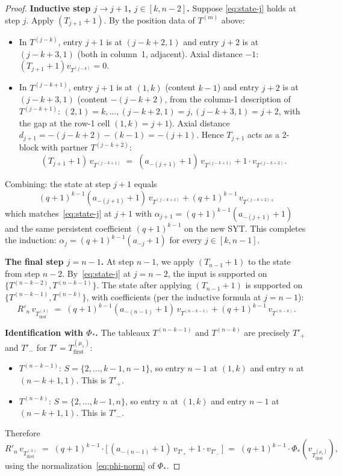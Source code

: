 \documentclass[11pt]{article}
\theoremstyle{definition}
\begin{document}
\begin{proof}
\textbf{Inductive step $j \to j+1$, $j \in [k, n-2]$.}  Suppose
\eqref{eq:state-j} holds at step $j$.  Apply $(T_{j+1} + 1)$.  By the
position data of $T^{(m)}$ above:
\begin{itemize}[leftmargin=2em,topsep=0.2em,itemsep=0.1em]
\item In $T^{(j-k)}$, entry $j+1$ is at $(j-k+2, 1)$ and entry $j+2$ is
   at $(j-k+3, 1)$ (both in column~1, adjacent).  Axial distance $-1$:
   $(T_{j+1} + 1) v_{T^{(j-k)}} = 0$.
\item In $T^{(j-k+1)}$, entry $j+1$ is at $(1, k)$ (content $k-1$) and
   entry $j+2$ is at $(j-k+3, 1)$ (content $-(j-k+2)$, from the column-1
   description of $T^{(j-k+1)}$: $(2,1) = k, \ldots, (j-k+2, 1) = j,
   (j-k+3, 1) = j+2$, with the gap at the row-1 cell $(1, k) = j+1$).
   Axial distance
   $d_{j+1} = -(j-k+2) - (k-1) = -(j+1)$.  Hence $T_{j+1}$ acts as a
   2-block with partner $T^{(j-k+2)}$:
   \[
      (T_{j+1}+1)\,v_{T^{(j-k+1)}}
      \;=\; (a_{-(j+1)} + 1)\,v_{T^{(j-k+1)}} + 1 \cdot v_{T^{(j-k+2)}}.
   \]
\end{itemize}
Combining: the state at step $j+1$ equals
\[
   (q+1)^{k-1}(a_{-(j+1)}+1)\,v_{T^{(j-k+1)}} + (q+1)^{k-1}\, v_{T^{(j-k+2)}},
\]
which matches~\eqref{eq:state-j} at $j+1$ with
$\alpha_{j+1} = (q+1)^{k-1}(a_{-(j+1)}+1)$ and the same persistent
coefficient $(q+1)^{k-1}$ on the new SYT.  This completes the induction:
$\alpha_j = (q+1)^{k-1}(a_{-j}+1)$ for every $j \in [k, n-1]$.

\textbf{The final step $j = n-1$.}  At step $n-1$, we apply
$(T_{n-1}+1)$ to the state from step $n-2$.  By~\eqref{eq:state-j} at
$j = n - 2$, the input is supported on $\{T^{(n-k-2)}, T^{(n-k-1)}\}$.
The state after applying $(T_{n-1}+1)$ is supported on
$\{T^{(n-k-1)}, T^{(n-k)}\}$, with coefficients (per the inductive
formula at $j = n-1$):
\[
   R'_n\, v_{T_{\mathrm{first}}^{(\lambda)}}
   \;=\; (q+1)^{k-1}(a_{-(n-1)}+1)\, v_{T^{(n-k-1)}}
       + (q+1)^{k-1}\, v_{T^{(n-k)}}.
\]

\textbf{Identification with $\Phi_*$.}  The tableaux $T^{(n-k-1)}$ and
$T^{(n-k)}$ are precisely $T'_+$ and $T'_-$ for
$T' = T_{\mathrm{first}}^{(\mu_1)}$:
\begin{itemize}[leftmargin=2em,topsep=0.2em,itemsep=0.1em]
\item $T^{(n-k-1)}$: $S = \{2, \ldots, k-1, n-1\}$, so entry $n-1$ at
   $(1,k)$ and entry $n$ at $(n-k+1, 1)$.  This is $T'_+$.
\item $T^{(n-k)}$: $S = \{2, \ldots, k-1, n\}$, so entry $n$ at $(1,k)$
   and entry $n-1$ at $(n-k+1, 1)$.  This is $T'_-$.
\end{itemize}
Therefore
\[
   R'_n\, v_{T_{\mathrm{first}}^{(\lambda)}}
   \;=\; (q+1)^{k-1} \cdot \big[\,(a_{-(n-1)} + 1)\, v_{T'_+}
       + 1 \cdot v_{T'_-}\,\big]
   \;=\; (q+1)^{k-1} \cdot \Phi_*(v_{T_{\mathrm{first}}^{(\mu_1)}}),
\]
using the normalization~\eqref{eq:phi-norm} of $\Phi_*$.
\end{proof}
\end{document}
